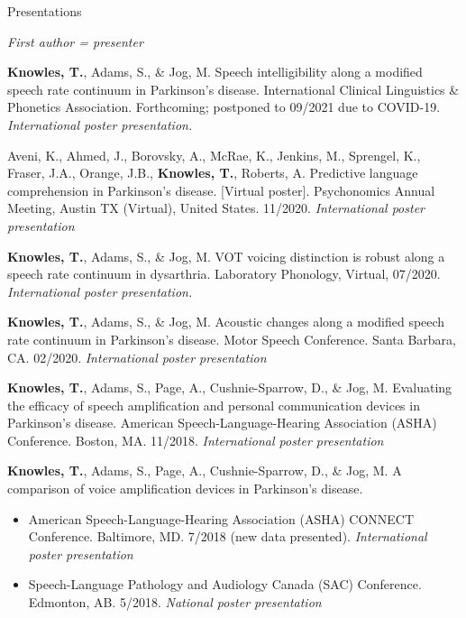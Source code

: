 \documentclass{resume} %
\begin{document}
\begin{rSection}{Presentations}
\begin{center}
	\emph{First author = presenter}
\end{center}

\begin{etaremune}

\item {\bf Knowles, T.}, Adams, S., \& Jog, M. Speech intelligibility along a modified speech rate continuum in Parkinson's disease. International Clinical Linguistics \& Phonetics Association. Forthcoming; postponed to 09/2021 due to COVID-19.  \emph{International poster presentation.}

Aveni, K., Ahmed, J., Borovsky, A., McRae, K., Jenkins, M., Sprengel, K., Fraser, J.A., Orange, J.B., {\bf Knowles, T.}, Roberts, A. Predictive language comprehension in Parkinson’s disease. [Virtual poster]. Psychonomics Annual Meeting, Austin TX (Virtual), United States. 11/2020. \emph{International poster presentation}

\item  {\bf Knowles, T.}, Adams, S., \& Jog, M. VOT voicing distinction is robust along a speech rate continuum in dysarthria. Laboratory Phonology, Virtual, 07/2020.  \emph{International poster presentation.}
   
\item {\bf Knowles, T.}, Adams, S., \& Jog, M. Acoustic changes along a modified speech rate continuum in Parkinson's disease. Motor Speech Conference. Santa Barbara, CA. 02/2020. \emph{International poster presentation}

\item {\bf Knowles, T.}, Adams, S., Page, A., Cushnie-Sparrow, D., \& Jog, M. Evaluating the efficacy of speech amplification and personal communication devices in Parkinson's disease. American Speech-Language-Hearing Association (ASHA) Conference. Boston, MA. 11/2018. \emph{International poster presentation}
	
\item {\bf Knowles, T.}, Adams, S., Page, A., Cushnie-Sparrow, D., \& Jog, M. A comparison of voice amplification devices in Parkinson's disease. 
		\begin{itemize}
			\renewcommand\labelitemi{$\cdot$}
			\item American Speech-Language-Hearing Association (ASHA) CONNECT Conference. Baltimore, MD. 7/2018 (new data presented). \emph{International poster presentation}
			\item Speech-Language Pathology and Audiology Canada (SAC) Conference. Edmonton, AB. 5/2018. \emph{National poster presentation}
		\end{itemize}
	

\end{etaremune}
\end{rSection}
\end{document}
